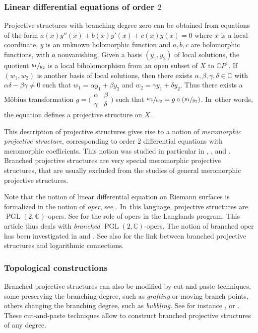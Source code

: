 \documentclass[10pt]{amsart}
\newcommand{\C}{\mathbb C}
\newcommand{\CP}{\mathbb CP}
\DeclareMathOperator{\PGL}{PGL}
\theoremstyle{definition}
\theoremstyle{plain}
\begin{document}
\subsubsection*{Linear differential equations of order $2$}
Projective structures with branching degree zero can be obtained from equations of the form $a(x)y''(x) + b(x)y'(x) + c(x)y(x) = 0$ where $x$ is a local coordinate, $y$ is an unknown holomorphic function and $a, b, c$ are holomorphic functions, with $a$ nonvanishing.
Given a basis $(y_1, y_2)$ of local solutions, the quotient $\sfrac{y_1}{y_2}$ is a local biholomorphism from an open subset of $X$ to $\CP^1$.
If $(w_1, w_2)$ is another basis of local solutions, then there exists $\alpha, \beta, \gamma, \delta \in \C$ with $\alpha \delta - \beta \gamma \neq 0$ such that $w_1 = \alpha y_1 + \beta y_2$ and $w_2 = \gamma y_1 + \delta y_2$.
Thus there exists a Möbius transformation $g =\bigl(\begin{smallmatrix} \alpha & \beta \\ \gamma & \delta \end{smallmatrix}\bigr)$ such that $\sfrac{w_1}{w_2} = g \circ(\sfrac{y_1}{y_2})$. In~other words, the equation defines a projective structure on $X$.

This description of projective structures gives rise to a notion of \emph{meromorphic projective structure}, corresponding to order $2$ differential equations with meromorphic coefficients.
This notion was studied in particular in \cite{allegretti-bridgeland}, \cite{gupta-mj}, \cite{gupta-mj_2} and \cite{serandour}.
Branched projective structures are very special meromorphic projective structures, that are usually excluded from the studies of general meromorphic projective structures.

Note that the notion of linear differential equation on Riemann surfaces is formalized in the notion of \emph{oper}, see \cite{beilinson-drinfeld}. In~this language, projective structures are $\PGL(2, \C)$-opers. See \cite{frenkel} for the role of opers in the Langlands program.
This article thus deals with \emph{branched} $\PGL(2, \C)$-opers.
The notion of branched oper has been investigated in \cite{frenkel-gaitsgory} and \cite{biswas-dumitrescu-heller}.
See also \cite{biswas-dumitrescu-gupta} for the link between branched projective structures and logarithmic connections.

\subsubsection*{Topological constructions}
Branched projective structures can also be modified by cut-and-paste techniques, some preserving the branching degree, such as \emph{grafting} or {moving branch points}, others changing the branching degree, such as \emph{bubbling}.
See for instance \cite{dumas}, \cite{gallo-kapovich-marden} or \cite{calsamiglia-deroin-francaviglia}.
These cut-and-paste techniques allow to construct branched projective structures of any degree.
\end{document}
